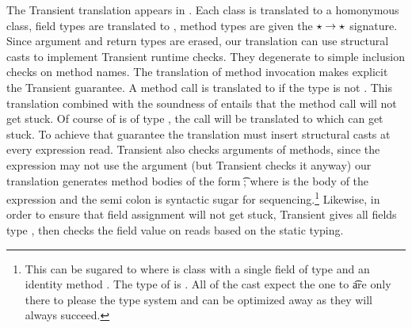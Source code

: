\documentclass[acmlarge, anonymous, authordraft, review]{acmart} %
\begin{document}
The Transient translation appears in . Each class is translated
to a homonymous \kafka class, field types are translated to \any, method
types are given the $\star \to \star$ signature. Since argument and return
types are erased, our translation can use structural casts to implement
Transient runtime checks. They degenerate to simple inclusion checks on
method names.  The translation of method invocation makes explicit the
Transient guarantee.  A method call \Call\e\m\ep is translated to
\KCall\e\m\ep\any\any if the type \e is not \any. This translation combined
with the soundness of \kafka entails that the method call will not get
stuck.  Of course of \e is of type \any, the call will be translated to
\DynCall\e\m\ep which can get stuck.  To achieve that guarantee the
translation must insert structural casts at every expression read. Transient
also checks arguments of methods, since the expression may not use the
argument (but Transient checks it anyway) our translation generates method
bodies of the form \SubCast\t\x; \e where \e is the body of the expression
and the semi colon is syntactic sugar for sequencing.\footnote{This can be
  sugared to
  \SubCast\tp{\KCall{\New\A{\SubCast\any{\SubCast\t\x}}}\m{\SubCast\any\e}\any\any}
  where \A is class with a single field of type \any and an identity method
  \m. The type of \e is \tp. All of the cast expect the one to \t are only
  there to please the type system and can be optimized away as they will
  always succeed. } Likewise, in order to ensure that field assignment will
not get stuck, Transient gives all fields type \any, then checks the field
value on reads based on the static typing.
\end{document}
